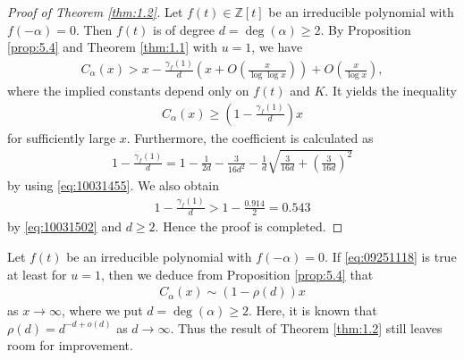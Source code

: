 \documentclass[a4paper,11pt]{amsart}
\theoremstyle{definition}
\numberwithin{equation}{section}
\begin{document}
\begin{proof}[Proof of Theorem \ref{thm:1.2}]
Let $f(t) \in \mathbb{Z}[t]$ be an irreducible polynomial with $f(-\alpha)=0$. 
Then $f(t)$ is of degree $d=\deg(\alpha) \geq2$. 
By Proposition \ref{prop:5.4} and Theorem \ref{thm:1.1} with $u=1$, we have 
\begin{align*}
C_\alpha(x)
> x- \frac{\gamma_f(1)}{d} \left(x+O\left(\frac{x}{\log\log{x}}\right)\right) 
+ O\left(\frac{x}{\log{x}}\right), 
\end{align*}
where the implied constants depend only on $f(t)$ and $K$. 
It yields the inequality
\begin{align*}
C_\alpha(x)
\geq \left(1-\frac{\gamma_f(1)}{d}\right)x
\end{align*}
for sufficiently large $x$. 
Furthermore, the coefficient is calculated as
\begin{align*}
1-\frac{\gamma_f(1)}{d}
= 1-\frac{1}{2d}-\frac{3}{16d^2}-\frac{1}{d}\sqrt{\frac{3}{16d}+\left(\frac{3}{16d}\right)^2} 
\end{align*}
by using \eqref{eq:10031455}. 
We also obtain
\begin{align*}
1-\frac{\gamma_f(1)}{d}
> 1-\frac{0.914}{2}
= 0.543
\end{align*}
by \eqref{eq:10031502} and $d \geq2$. 
Hence the proof is completed. 
\end{proof}

Let $f(t)$ be an irreducible polynomial with $f(-\alpha)=0$. 
If \eqref{eq:09251118} is true at least for $u=1$, then we deduce from Proposition \ref{prop:5.4} that
\begin{align*}
C_\alpha(x)
\sim (1-\rho(d))x
\end{align*}
as $x \to\infty$, where we put $d=\deg(\alpha) \geq2$. 
Here, it is known that $\rho(d)=d^{-d+o(d)}$ as $d \to\infty$. 
Thus the result of Theorem \ref{thm:1.2} still leaves room for improvement. 
\end{document}
